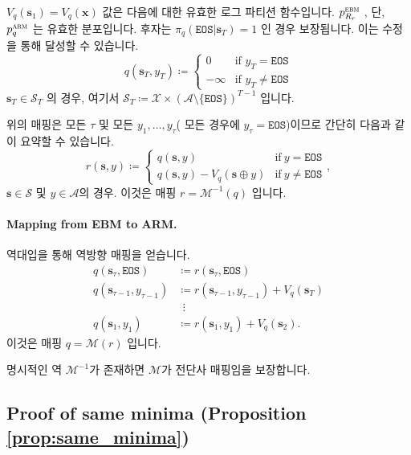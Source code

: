 \documentclass{article}
\def\s{{\bm{s}}}
\def\x{{\bm{x}}}
\def\cA{{\mathcal{A}}}
\def\cM{{\mathcal{M}}}
\def\cS{{\mathcal{S}}}
\def\cX{{\mathcal{X}}}
\newcommand{\Rsub}[1]{R_{#1}}
\def\arm{{\textsc{arm}}}
\def\ebm{{\textsc{ebm}}}
\def\eos{\texttt{EOS}\xspace}
\def\augvoc{\cA}
\begin{document}
$V_q(\s_1) = V_q(\x)$ 값은 다음에 대한 유효한 로그 파티션 함수입니다.
 $p^\ebm_{\Rsub{r}}$ , 단, $p^\arm_q$ 는 유효한 분포입니다.  후자는
$\pi_q(\eos|\s_T) = 1$ 인 경우 보장됩니다. 이는 수정을 통해 달성할 수 있습니다. 
 \begin{equation} 
q( \s _T, y_T) \coloneqq 
 \begin{cases} 
0 & \mbox{if } y_T = \eos \\
- \infty & \mbox{if } y_T \neq \eos 
 \end{cases} 
 \end{equation} 
$\s_T \in \cS_T$ 의 경우, 여기서 $\cS_T \coloneqq \cX \times (\augvoc \setminus
\{\eos\})^{T-1}$ 입니다.

위의 매핑은 모든 $\tau$ 및 모든 $y_1, \ldots, y_\tau$(
 모든 경우에 $y_\tau = \eos$)이므로 간단히 다음과 같이 요약할 수 있습니다.
 \begin{equation} 
r( \s , y) \coloneqq 
 \begin{cases} 
q( \s , y) & \mbox{if} ~ y = \eos \\
q( \s , y) - V_q( \s \oplus y) & \mbox{if} ~ y \neq \eos 
 \end{cases},
 \end{equation} 
$\s \in \cS$ 및 $y \in \augvoc$의 경우.
이것은 매핑 $r = \cM^{-1}(q)$ 입니다.


\paragraph{Mapping from EBM to ARM.}

역대입을 통해 역방향 매핑을 얻습니다.
 \begin{align} 
q( \s _ \tau , \eos ) & \coloneqq r( \s _ \tau , \eos ) \\
q( \s _{ \tau -1}, y_{ \tau -1}) & \coloneqq r( \s _{ \tau -1}, y_{ \tau -1}) + V_q( \s _T) \\
              &~~ \vdots \\
q( \s _1, y_1) & \coloneqq r( \s _1, y_1) + V_q( \s _2).
 \end{align} 
이것은 매핑 $q = \cM(r)$ 입니다.

명시적인 역 $\cM^{-1}$가 존재하면 $\cM$가 전단사 매핑임을 보장합니다.

\subsection{Proof of same minima (Proposition \ref{prop:same_minima})} 
 \label{proof:same_minima}
\end{document}

